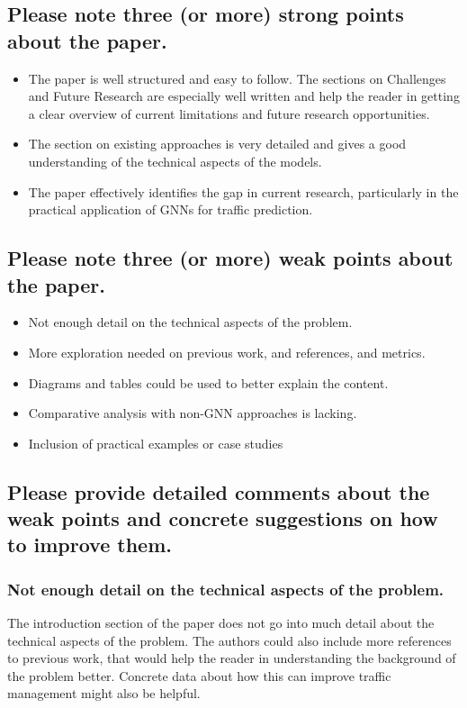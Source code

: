 \documentclass[12pt]{article}
\begin{document}
\subsection*{Please note three (or more) strong points about the paper.}
\begin{itemize}
    \item The paper is well structured and easy to follow. The sections on Challenges and Future Research are especially well written and help the reader in getting a clear overview of current limitations and future research opportunities.
    \item The section on existing approaches is very detailed and gives a good understanding of the technical aspects of the models.
    \item The paper effectively identifies the gap in current research, particularly in the practical application of GNNs for traffic prediction.
\end{itemize}


\subsection*{Please note three (or more) weak points about the paper.}
 \begin{itemize}
    \item Not enough detail on the technical aspects of the problem.
    \item More exploration needed on previous work, and references, and metrics.
    \item Diagrams and tables could be used to better explain the content.
    \item Comparative analysis with non-GNN approaches is lacking.
    \item Inclusion of practical examples or case studies
 \end{itemize}


\subsection*{Please provide detailed comments about the weak points and concrete suggestions on how to improve them.}
\subsubsection*{Not enough detail on the technical aspects of the problem.}
The introduction section of the paper does not go into much detail about the technical aspects of the problem. The authors could also include
more references to previous work, that would help the reader in understanding the background of the problem better. Concrete data about how 
this can improve traffic management might also be helpful. 
\end{document}
